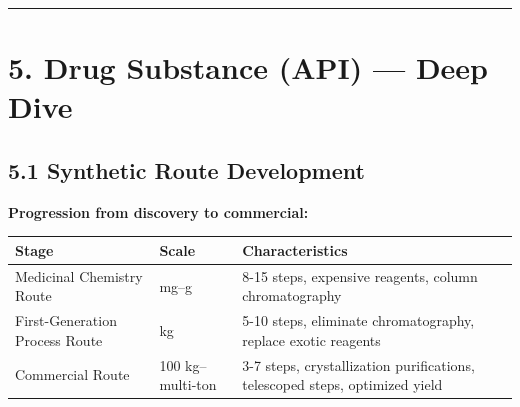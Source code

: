 \documentclass[
  11pt,
  a4paper,
]{report}
\begin{document}
\begin{center}\rule{0.5\linewidth}{0.5pt}\end{center}

\hypertarget{drug-substance-api-deep-dive}{%
\section{5. Drug Substance (API) --- Deep
Dive}\label{drug-substance-api-deep-dive}}

\hypertarget{synthetic-route-development}{%
\subsection{5.1 Synthetic Route
Development}\label{synthetic-route-development}}

\textbf{Progression from discovery to commercial:}

\begin{longtable}[]{@{}lll@{}}
\toprule
\begin{minipage}[b]{0.21\columnwidth}\raggedright
Stage\strut
\end{minipage} & \begin{minipage}[b]{0.21\columnwidth}\raggedright
Scale\strut
\end{minipage} & \begin{minipage}[b]{0.49\columnwidth}\raggedright
Characteristics\strut
\end{minipage}\tabularnewline
\midrule
\endhead
\begin{minipage}[t]{0.21\columnwidth}\raggedright
Medicinal Chemistry Route\strut
\end{minipage} & \begin{minipage}[t]{0.21\columnwidth}\raggedright
mg--g\strut
\end{minipage} & \begin{minipage}[t]{0.49\columnwidth}\raggedright
8-15 steps, expensive reagents, column chromatography\strut
\end{minipage}\tabularnewline
\begin{minipage}[t]{0.21\columnwidth}\raggedright
First-Generation Process Route\strut
\end{minipage} & \begin{minipage}[t]{0.21\columnwidth}\raggedright
kg\strut
\end{minipage} & \begin{minipage}[t]{0.49\columnwidth}\raggedright
5-10 steps, eliminate chromatography, replace exotic reagents\strut
\end{minipage}\tabularnewline
\begin{minipage}[t]{0.21\columnwidth}\raggedright
Commercial Route\strut
\end{minipage} & \begin{minipage}[t]{0.21\columnwidth}\raggedright
100 kg--multi-ton\strut
\end{minipage} & \begin{minipage}[t]{0.49\columnwidth}\raggedright
3-7 steps, crystallization purifications, telescoped steps, optimized
yield\strut
\end{minipage}\tabularnewline
\bottomrule
\end{longtable}
\end{document}
